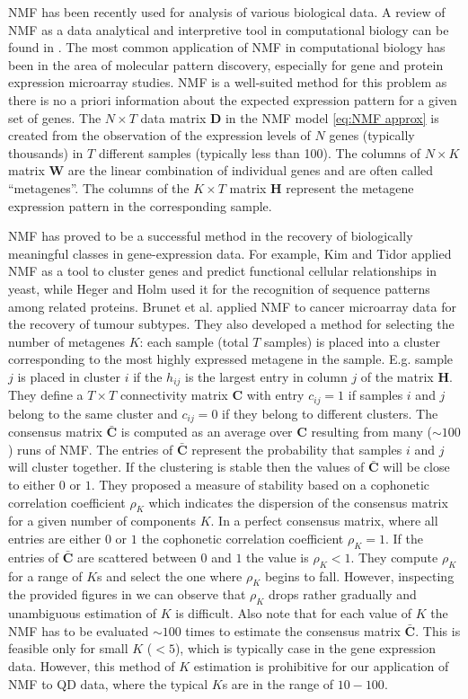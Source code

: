 NMF has been recently used for analysis of various biological data. A review of NMF as a data analytical and interpretive tool in computational biology can be found in \cite{Devarajan2008}. The most common application of NMF in computational biology has been in the area of molecular pattern discovery, especially for gene and protein expression microarray studies. NMF is a well-suited method for this problem as there is no a priori information about the expected expression pattern for a given set of genes. The $N\times T$ data matrix $\bm{D}$ in the NMF model \autoref{eq:NMF approx} is created from the observation of the expression levels of $N$ genes (typically thousands) in $T$ different samples (typically less than 100). The columns of $N\times K$ matrix $\bm{W}$ are the linear combination of individual genes and are often called ``metagenes''.  The columns of the $K\times T$ matrix $\bm{H}$ represent the metagene expression pattern in the corresponding sample.

NMF has proved to be a successful method in the recovery of biologically meaningful classes in gene-expression data. For example, Kim and Tidor \cite{Kim2003} applied NMF as a tool to cluster genes and predict functional cellular relationships in yeast, while Heger and Holm \cite{Heger2003} used it for the recognition of sequence patterns among related proteins. Brunet et al. \cite{Brunet2004} applied NMF to cancer microarray data for the recovery of tumour subtypes. They also developed a method for selecting the number of metagenes $K$: each sample (total $T$ samples) is placed into a cluster corresponding to the most highly expressed metagene in the sample. E.g. sample $j$ is placed in cluster $i$ if the $h_{ij}$ is the largest entry in column $j$ of the matrix $\bm{H}$. They define a $T\times T$ connectivity matrix $\bm{C}$ with entry $c_{ij}=1$ if samples $i$ and $j$ belong to the same cluster and $c_{ij}=0$ if they belong to different clusters. The consensus matrix $\bar{\bm{C}}$ is computed as an average over $\bm{C}$ resulting from many ($\sim100$) runs of NMF. The entries of $\bar{\bm{C}}$ represent the probability that samples $i$ and $j$ will cluster together. If the clustering is stable then the values of $\bar{\bm{C}}$ will be close to either $0$ or $1$. They proposed a measure of stability based on a cophonetic correlation coefficient $\rho_K$ which indicates the dispersion of the consensus matrix for a given number of components $K$. In a perfect consensus matrix, where all entries are either $0$ or $1$ the cophonetic correlation coefficient $\rho_K=1$. If the entries of $\bar{\bm{C}}$ are scattered between $0$ and $1$ the value is $\rho_K<1$. They compute $\rho_K$ for a range of $K$s and select the one where $\rho_K$ begins to fall. However, inspecting the provided figures in \cite{Brunet2004} we can observe that $\rho_K$ drops rather gradually and unambiguous estimation of $K$ is difficult. Also note that for each value of $K$ the NMF has to be evaluated $\sim 100$ times to  estimate the consensus matrix $\bar{\bm{C}}$. This is feasible only for small $K$ ($<5$), which is typically case in the gene expression data. However, this method of $K$ estimation is prohibitive for our application of NMF to QD data, where the typical $K$s are in the range of $10-100$.


